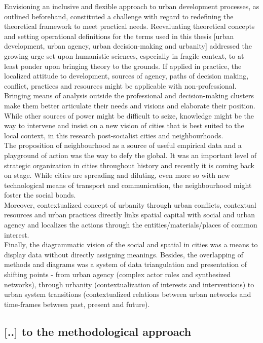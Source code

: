 \documentclass[11pt]{report}
\begin{document}
Envisioning an inclusive and flexible approach to  urban development processes, as outlined beforehand, constituted a challenge with regard to redefining the theoretical framework to meet practical needs.
Reevaluating theoretical concepts and setting operational definitions for the terms used in this thesis [urban development, urban agency, urban decision-making and urbanity] addressed the growing urge set upon humanistic sciences, especially in fragile context, to at least ponder upon bringing theory to the grounds.
If applied in practice, the localized attitude to  development, sources of agency, paths of decision making, conflict, practices and resources might be applicable with non-professional. 
Bringing means of analysis outside the professional and decision-making clusters make them better articulate their needs and visions and elaborate their position.
While other sources of power might be difficult to seize, knowledge might be the way to intervene and insist on a new vision of cities that is best suited to the local context, in this research post-socialist cities and neighbourhoods.
\\
The proposition of neighbourhood as a source of  useful empirical data and a playground of action was the way to defy the global. It was an important level of strategic organization in cities throughout history and recently it is coming back on stage.
While cities are spreading and diluting, even more so with new technological means of transport and communication, the neighbourhood might foster the social bonds.
\\
Moreover, contextualized concept of urbanity through urban conflicts, contextual resources and urban practices directly links spatial capital with social and urban agency and localizes the actions through the entities/materials/places of common interest.
\\
Finally, the diagrammatic vision of the social and spatial  in cities was a means to display data without directly assigning meanings.
Besides, the overlapping of methods and diagrams was a system of data triangulation and presentation of shifting points - from urban agency (complex actor roles and synthesized networks), through urbanity (contextualization of interests and interventions) to urban system transitions (contextualized relations between urban networks and time-frames between past, present and future).

\subsection{[..] to the methodological approach}
\end{document}
